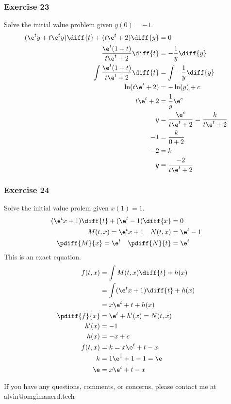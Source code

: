 \documentclass{math}
\begin{document}
\subsubsection*{Exercise 23}
Solve the initial value problem given \( y(0) = -1 \).
\begin{align*}
  (\e^ty+t\e^ty)\diff{t}+(t\e^t+2)\diff{y} &= 0 \\
  \frac{\e^t(1+t)}{t\e^t+2}\diff{t} &= -\frac{1}{y}\diff{y} \\
  \int\frac{\e^t(1+t)}{t\e^t+2}\diff{t} &= \int-\frac{1}{y}\diff{y} \\
  \ln(t\e^t+2) &= -\ln(y)+c \\
  t\e^t+2 &= \frac{1}{y}\e^c \\
  y &= \frac{\e^c}{t\e^t+2} = \frac{k}{t\e^t+2} \\
  -1 &= \frac{k}{0+2} \\
  -2 &= k \\
  y &= \frac{-2}{t\e^t+2}
\end{align*}

\subsubsection*{Exercise 24}
Solve the initial value prolem given \( x(1) = 1 \).
\begin{align*}
  (\e^tx+1)\diff{t}+(\e^t-1)\diff{x} &= 0 \\
  M(t,x) = \e^tx+1 \quad N(t,x) &= \e^t-1 \\
  \pdiff{M}{x} = \e^t \quad \pdiff{N}{t} &= \e^t \\
\end{align*}
This is an exact equation.
\begin{align*}
  f(t,x) &= \int M(t,x)\diff{t}+h(x) \\
  &= \int(\e^tx+1)\diff{t}+h(x) \\
  &= x\e^t+t+h(x) \\
  \pdiff{f}{x} &= \e^t+h'(x) = N(t,x) \\
  h'(x) &= -1 \\
  h(x) &= -x+c \\
  f(t,x) &= k = x\e^t+t-x \\
  k &= 1\e^1+1-1 = \e \\
  \e &= x\e^t+t-x
\end{align*}

\begin{center}
  If you have any questions, comments, or concerns, please contact me at
  alvin@omgimanerd.tech
\end{center}
\end{document}
